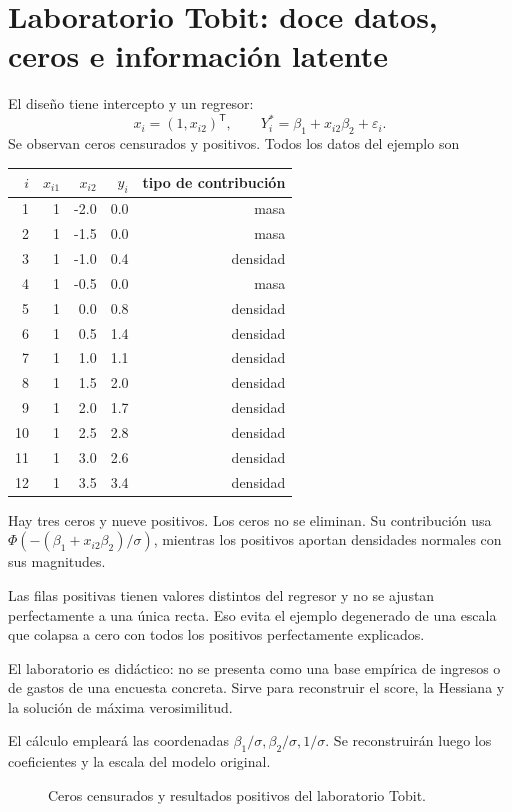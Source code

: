 \documentclass[11pt,a4paper]{article}
\newcommand{\T}{^{\mathsf T}}
\begin{document}
\clearpage
\section{Laboratorio Tobit: doce datos, ceros e información latente}\label{unidad105}
El diseño tiene intercepto y un regresor:
\[
x_i=(1,x_{i2})\T,\qquad
Y_i^\ast=\beta_1+x_{i2}\beta_2+\varepsilon_i.
\]
Se observan ceros censurados y positivos.
Todos los datos del ejemplo son
\begin{center}\small\begin{tabular}{rrrrr}\toprule
\(i\)&\(x_{i1}\)&\(x_{i2}\)&\(y_i\)&tipo de contribución\\\midrule
1&1&-2.0&0.0&masa\\
2&1&-1.5&0.0&masa\\
3&1&-1.0&0.4&densidad\\
4&1&-0.5&0.0&masa\\
5&1&0.0&0.8&densidad\\
6&1&0.5&1.4&densidad\\
7&1&1.0&1.1&densidad\\
8&1&1.5&2.0&densidad\\
9&1&2.0&1.7&densidad\\
10&1&2.5&2.8&densidad\\
11&1&3.0&2.6&densidad\\
12&1&3.5&3.4&densidad\\\bottomrule\end{tabular}\end{center}
Hay tres ceros y nueve positivos.
Los ceros no se eliminan.
Su contribución usa
\(\Phi(-(\beta_1+x_{i2}\beta_2)/\sigma)\),
mientras los positivos aportan
densidades normales con sus magnitudes.

Las filas positivas tienen
valores distintos del regresor
y no se ajustan perfectamente
a una única recta.
Eso evita el ejemplo degenerado
de una escala que colapsa a cero
con todos los positivos perfectamente explicados.

El laboratorio es didáctico:
no se presenta como una base
empírica de ingresos o de
gastos de una encuesta concreta.
Sirve para reconstruir el
score, la Hessiana y
la solución de máxima verosimilitud.

El cálculo empleará las
coordenadas \(\beta_1/\sigma,\beta_2/\sigma,1/\sigma\).
Se reconstruirán luego
los coeficientes y la escala
del modelo original.

\begin{figure}[H]\centering
{}
\caption{Ceros censurados y resultados positivos del laboratorio Tobit.}
\end{figure}
\end{document}
